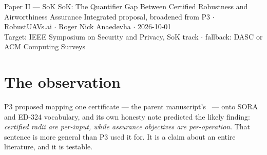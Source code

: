 \documentclass[11pt,a4paper]{article}
\begin{document}
\proposalheader
  {Paper II --- SoK}
  {SoK: The Quantifier Gap Between Certified Robustness and Airworthiness
   Assurance}
  {Integrated proposal, broadened from P3 $\cdot$ RobustUAVs.ai $\cdot$
   Roger Nick Anaedevha $\cdot$ 2026-10-01\\
   Target: IEEE Symposium on Security and Privacy, SoK track $\cdot$
   fallback: DASC or ACM Computing Surveys}

\begin{abstract}
\noindent
Certified-robustness research and aviation assurance both promise guarantees
about learned systems, and both are now being asked to meet: EASA's
learning-assurance framework and the forthcoming ED-324 expect evidence about
machine-learning constituents, and the robustness literature produces
certificates in quantity. We argue that the two rarely meet because they
quantify over different things. A certified radius is a statement about
\emph{every perturbation of one input}; a contingency volume is a statement
about \emph{one operation}; a safety objective per flight hour is a statement
about \emph{a population of operations}. Evidence transfers from a guarantee to
an objective only when the guarantee's quantifier dominates the objective's, or
when a \emph{lifting argument} --- a dynamics bound, a concentration inequality,
a runtime monitor --- bridges them, at the price of an assumption that itself
needs evidence. We propose to systematise the certified-guarantee literature for
learned perception, navigation and control by quantifier, to code SORA and EASA
learning-assurance objectives the same way, and to tabulate which transfers are
sound, which require a lift, and which are category errors. A SORA Annex~A
evidence generator demonstrates the sound path end to end.
\end{abstract}

\section{The observation}
P3 proposed mapping one certificate --- the parent manuscript's~\cite{parentpaper}
--- onto SORA and ED-324 vocabulary, and its own honesty note predicted the
likely finding: \emph{certified radii are per-input, while assurance objectives
are per-operation}. That sentence is more general than P3 used it for. It is a
claim about an entire literature, and it is testable.
\end{document}

